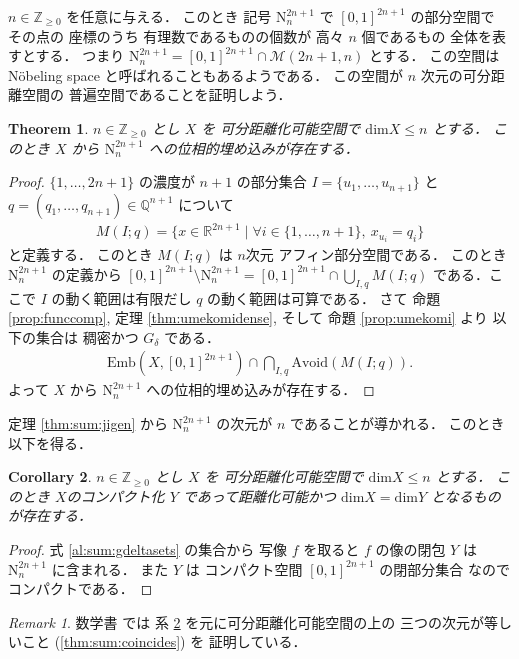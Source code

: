 \documentclass[leqno, a4paper, 12pt]{jsarticle}
\theoremstyle{plain}
\newtheorem{thm}{Theorem}[section]
\newtheorem{cor}[thm]{Corollary}
\theoremstyle{definition}
\theoremstyle{remark}
\newtheorem{rmk}{Remark}[section]
\newcommand{\zz}{\mathbb{Z}}
\newcommand{\qq}{\mathbb{Q}}
\newcommand{\rr}{\mathbb{R}}
\newcommand{\yodim}{\mathrm{dim}}
\newcommand{\yoavoid}[1]{\mathrm{Avoid}(#1)}
\newcommand{\yoemb}[2]{\mathrm{Emb}(#1, #2)}
\newcommand{\yonebsp}[1]{\mathrm{N}_{#1}^{2#1+1}}
\newcommand{\yospspfont}{\mathscr}
\newcommand{\yommsp}[2]{\yospspfont{M}({#1}, {#2})}
\numberwithin{equation}{section}
\begin{document}
$n\in \zz_{\ge 0}$
を任意に与える．
このとき
記号
$\yonebsp{n}$
で
$[0, 1]^{2n+1}$
の部分空間で
その点の
座標のうち
有理数であるものの個数が
高々
$n$
個であるもの
全体を表すとする．
つまり
$\yonebsp{n}=[0, 1]^{2n+1}\cap \yommsp{2n+1}{n}$
とする．
この空間は
N\"{o}beling space
と呼ばれることもあるようである．
この空間が
$n$
次元の可分距離空間の
普遍空間であることを証明しよう．
\begin{thm}\label{thm:sum:nebspuniv}
$n\in \zz_{\ge 0}$
とし
$X$
を
可分距離化可能空間で
$\yodim X\le n$
とする．
このとき
$X$
から
$\yonebsp{n}$
への位相的埋め込みが存在する．
\end{thm}
\begin{proof}
$\{1, \dots, 2n+1\}$
の濃度が
$n+1$
の部分集合
$I=\{u_{1}, \dots, u_{n+1}\}$
と
$q=(q_{1}, \dots, q_{n+1})\in \qq^{n+1}$
について
\begin{align}
M(I; q)=\{x\in \rr^{2n+1}\mid \forall i\in \{1, \dots, n+1\}, \ x_{u_{i}}=q_{i}\}
\end{align}
と定義する．
このとき
$M(I; q)$
は
$n$次元
アフィン部分空間である．
このとき
$\yonebsp{n}$
の定義から
$[0, 1]^{2n+1}\setminus \yonebsp{n}=
[0, 1]^{2n+1}\cap \bigcup_{I, q}M(I; q)$
である．ここで
$I$
の動く範囲は有限だし
$q$
の動く範囲は可算である．
さて
命題
\ref{prop:funccomp}, 
定理
\ref{thm:umekomidense}, 
そして
命題
\ref{prop:umekomi}
より
以下の集合は
稠密かつ
$G_{\delta}$
である．
\begin{align}\label{al:sum:gdeltasets}
\yoemb{X}{[0, 1]^{2n+1}}\cap\bigcap_{I, q}\yoavoid{M(I; q)}.
\end{align}
よって
$X$
から
$\yonebsp{n}$
への位相的埋め込みが存在する．
\end{proof}


定理
\ref{thm:sum:jigen}
から
$\yonebsp{n}$
の次元が
$n$
であることが導かれる．
このとき以下を得る．
\begin{cor}\label{cor:sum:sptfyndim}
$n\in \zz_{\ge 0}$
とし
$X$
を
可分距離化可能空間で
$\yodim X\le n$
とする．
このとき
$X$のコンパクト化
$Y$
であって距離化可能かつ
$\yodim X=\yodim Y$
となるものが存在する．
\end{cor}
\begin{proof}
式
\eqref{al:sum:gdeltasets}
の集合から
写像
$f$
を取ると
$f$
の像の閉包
$Y$
は
$\yonebsp{n}$
に含まれる．
また
$Y$
は
コンパクト空間
$[0, 1]^{2n+1}$
の閉部分集合
なので
コンパクトである．
\end{proof}

\begin{rmk}
数学書
\cite{zbMATH07075997}
では
系
\ref{cor:sum:sptfyndim}
を元に可分距離化可能空間の上の
三つの次元が等しいこと
(\ref{thm:sum:coincides})
を
証明している．
\end{rmk}
\end{document}
